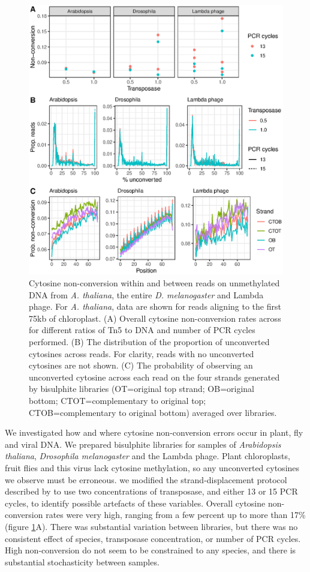 \documentclass[12pt,longbibliography]{article}
\begin{document}
\begin{figure}
    \includegraphics{figure1.eps}
    \caption{
        Cytosine non-conversion within and between reads on unmethylated DNA from \textit{A. thaliana}, the entire \textit{D. melanogaster} and Lambda phage. For \textit{A. thaliana}, data are shown for reads aligning to the first 75kb of chloroplast.
        (A) Overall cytosine non-conversion rates across for different ratios of Tn5 to DNA and number of PCR cycles performed.
        (B) The distribution of the proportion of unconverted cytosines across reads. For clarity, reads with no unconverted cytosines are not shown.
        (C) The probability of observing an unconverted cytosine across each read on the four strands generated by bisulphite libraries (OT=original top strand; OB=original bottom; CTOT=complementary to original top; CTOB=complementary to original bottom) averaged over libraries.
    }
    \label{fig:reads}

\end{figure}

We investigated how and where cytosine non-conversion errors occur in plant, fly and viral DNA.
We prepared bisulphite libraries for samples of \textit{Arabidopsis thaliana}, \textit{Drosophila melanogaster} and the Lambda phage.
Plant chloroplasts, fruit flies and this virus lack cytosine methylation, so any unconverted cytosines we observe must be erroneous.
we modified the strand-displacement protocol described by \textcite{weichenhan2018tagmentation} to use two concentrations of transposase, and either 13 or 15 PCR cycles, to identify possible artefacts of these variables.
Overall cytosine non-conversion rates were very high, ranging from a few percent up to more than 17\% (figure \ref{fig:reads}A).
There was substantial variation between libraries, but there was no consistent effect of species, transposase concentration, or number of PCR cycles.
High non-conversion do not seem to be constrained to any species, and there is substantial stochasticity between samples.
\end{document}
